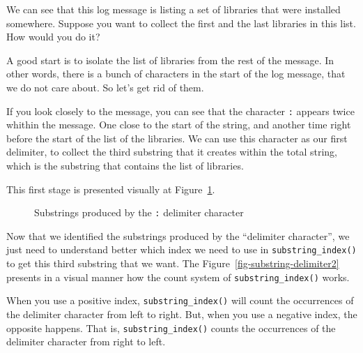 \documentclass[
  11pt,
  letterpaper,
  DIV=11,
  numbers=noendperiod]{scrreprt}
\begin{document}
We can see that this log message is listing a set of libraries that were
installed somewhere. Suppose you want to collect the first and the last
libraries in this list. How would you do it?

A good start is to isolate the list of libraries from the rest of the
message. In other words, there is a bunch of characters in the start of
the log message, that we do not care about. So let's get rid of them.

If you look closely to the message, you can see that the character
\texttt{:} appears twice whithin the message. One close to the start of
the string, and another time right before the start of the list of the
libraries. We can use this character as our first delimiter, to collect
the third substring that it creates within the total string, which is
the substring that contains the list of libraries.

This first stage is presented visually at
Figure~\ref{fig-substring-delimiter1}.

\begin{figure}


\caption{\label{fig-substring-delimiter1}Substrings produced by the
\texttt{:} delimiter character}

\end{figure}%

Now that we identified the substrings produced by the ``delimiter
character'', we just need to understand better which index we need to
use in \texttt{substring\_index()} to get this third substring that we
want. The Figure~\ref{fig-substring-delimiter2} presents in a visual
manner how the count system of \texttt{substring\_index()} works.

When you use a positive index, \texttt{substring\_index()} will count
the occurrences of the delimiter character from left to right. But, when
you use a negative index, the opposite happens. That is,
\texttt{substring\_index()} counts the occurrences of the delimiter
character from right to left.
\end{document}
